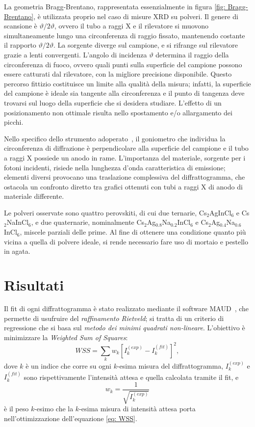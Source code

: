 \documentclass[a4paper,twocolumn,12 pt]{article}
\begin{document}
La geometria Bragg-Brentano, rappresentata essenzialmente in figura \ref{fig: Bragg-Brentano}, è utilizzata proprio nel caso di misure XRD su polveri. Il genere di scansione è $\vartheta / 2\vartheta$, ovvero il tubo a raggi X e il rilevatore si muovono simultaneamente lungo una circonferenza di raggio fissato, mantenendo costante il rapporto $\vartheta / 2\vartheta$. La sorgente diverge sul campione, e si rifrange sul rilevatore grazie a lenti convergenti. L'angolo di incidenza $\vartheta$ determina il raggio della circonferenza di fuoco, ovvero quali punti sulla superficie del campione possono essere catturati dal rilevatore, con la migliore precisione disponibile. Questo percorso fittizio costituisce un limite alla qualità della misura; infatti, la superficie del campione è ideale sia tangente alla circonferenza e il punto di tangenza deve trovarsi sul luogo della superficie che si desidera studiare. L'effetto di un posizionamento non ottimale risulta nello spostamento e/o allargamento dei picchi.

Nello specifico dello strumento adoperato~\supercite{XRD:spec}, il goniometro che individua la circonferenza di diffrazione è perpendicolare alla superficie del campione e il tubo a raggi X possiede un anodo in rame. L'importanza del materiale, sorgente per i fotoni incidenti, risiede nella lunghezza d'onda caratteristica di emissione; elementi diversi provocano una traslazione complessiva del diffrattogramma, che ostacola un confronto diretto tra grafici ottenuti con tubi a raggi X di anodo di materiale differente.

Le polveri osservate sono quattro perovskiti, di cui due ternarie, Cs$_2$AgInCl$_6$ e Cs$_2$NaInCl$_6$, e due quaternarie, nominalmente Cs$_2$Ag$_{0.8}$Na$_{0.2}$InCl$_6$ e Cs$_2$Ag$_{0.4}$Na$_{0.6}$InCl$_6$, miscele parziali delle prime. Al fine di ottenere una condizione quanto più vicina a quella di polvere ideale, si rende necessario fare uso di mortaio e pestello in agata.


\section*{Risultati}
Il fit di ogni diffrattogramma è stato realizzato mediante il software MAUD~\supercite{maud}, che permette di usufruire del \emph{raffinamento Rietveld}; si tratta di un criterio di regressione che si basa sul \emph{metodo dei minimi quadrati non-lineare}. L'obiettivo è minimizzare la \emph{Weighted Sum of Squares}:
\begin{equation}
  WSS = \displaystyle\sum_{k} w_k \left\lbrack I^{(exp)}_k - I^{(fit)}_k \right\rbrack^2,
  \label{eq: WSS}
\end{equation}
dove $k$ è un indice che corre su ogni $k$-esima misura del diffrattogramma, $I^{(exp)}_k$ e $I^{(fit)}_k$ sono rispettivamente l'intensità attesa e quella calcolata tramite il fit, e
\begin{equation}
  w_k = \frac{1}{\sqrt{I^{(exp)}_k}}
  \label{eq: pesi}
\end{equation}
è il peso $k$-esimo che la $k$-esima misura di intensità attesa porta nell'ottimizzazione dell'equazione \ref{eq: WSS}.
\end{document}
